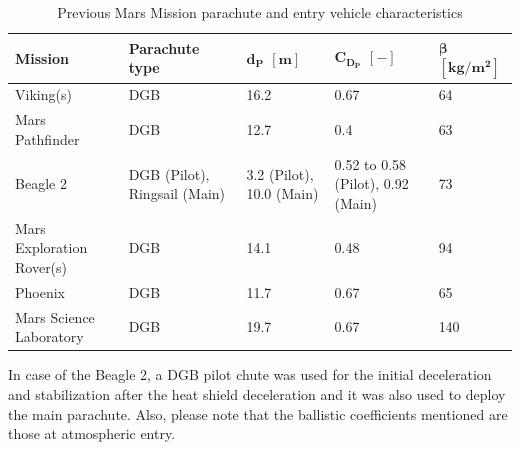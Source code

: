 \begin{table}[!ht]
\begin{center}
\caption{Previous Mars Mission parachute and entry vehicle characteristics}
\label{tab:refparachar}
\begin{tabular}{|l|p{3cm}|p{2cm}|p{3cm}|p{3cm}|}
\hline 
\textbf{Mission} 		& \textbf{Parachute type} & $\mathbf{d_{P}}$ $\mathbf{[m]}$ & $\mathbf{C_{D_{P}}}$ $\mathbf{[-]}$ & $\mathbf{\beta}$ $\mathbf{[kg/m^{2}]}$  \\ \hline \hline
Viking(s) 		& \ac{DGB} & 16.2 & 0.67 & 64\\ \hline
Mars Pathfinder & \ac{DGB} & 12.7 & 0.4 & 63\\ \hline
Beagle 2 		& \ac{DGB} (Pilot), Ringsail (Main) & 3.2 (Pilot), 10.0 (Main) & 0.52 to 0.58 \cite{ewing1978}(Pilot), 0.92 \cite{fallon2005} (Main) & 73 \cite{lafleur2011}\\ \hline
Mars Exploration Rover(s) 		& \ac{DGB} & 14.1 & 0.48 & 94\\ \hline
Phoenix 	& \ac{DGB} & 11.7 & 0.67 & 65 \cite{lafleur2011}\\ \hline
Mars Science Laboratory 	& \ac{DGB} & 19.7 & 0.67 & 140 \cite{lafleur2011}\\ \hline
	
\end{tabular}
\end{center}
\end{table}

In case of the Beagle 2, a \ac{DGB} pilot chute was used for the initial deceleration and stabilization after the heat shield deceleration and it was also used to deploy the main parachute. Also, please note that the ballistic coefficients mentioned are those at atmospheric entry. 

